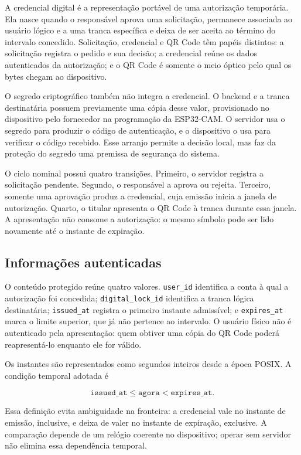 A credencial digital é a representação portável de uma autorização temporária. Ela nasce quando o responsável aprova uma solicitação, permanece associada ao usuário lógico e a uma tranca específica e deixa de ser aceita ao término do intervalo concedido. Solicitação, credencial e QR Code têm papéis distintos: a solicitação registra o pedido e sua decisão; a credencial reúne os dados autenticados da autorização; e o QR Code é somente o meio óptico pelo qual os bytes chegam ao dispositivo.

O segredo criptográfico também não integra a credencial. O backend e a tranca destinatária possuem previamente uma cópia desse valor, provisionado no dispositivo pelo fornecedor na programação da ESP32-CAM. O servidor usa o segredo para produzir o código de autenticação, e o dispositivo o usa para verificar o código recebido. Esse arranjo permite a decisão local, mas faz da proteção do segredo uma premissa de segurança do sistema.

O ciclo nominal possui quatro transições. Primeiro, o servidor registra a solicitação pendente. Segundo, o responsável a aprova ou rejeita. Terceiro, somente uma aprovação produz a credencial, cuja emissão inicia a janela de autorização. Quarto, o titular apresenta o QR Code à tranca durante essa janela. A apresentação não consome a autorização: o mesmo símbolo pode ser lido novamente até o instante de expiração.

\subsection{Informações autenticadas}

O conteúdo protegido reúne quatro valores. \texttt{user\_id} identifica a conta à qual a autorização foi concedida; \texttt{digital\_lock\_id} identifica a tranca lógica destinatária; \texttt{issued\_at} registra o primeiro instante admissível; e \texttt{expires\_at} marca o limite superior, que já não pertence ao intervalo. O usuário físico não é autenticado pela apresentação: quem obtiver uma cópia do QR Code poderá reapresentá-lo enquanto ele for válido.

Os instantes são representados como segundos inteiros desde a época POSIX. A condição temporal adotada é

\begin{equation}
    \texttt{issued\_at} \leq \texttt{agora} < \texttt{expires\_at}.
\end{equation}

Essa definição evita ambiguidade na fronteira: a credencial vale no instante de emissão, inclusive, e deixa de valer no instante de expiração, exclusive. A comparação depende de um relógio coerente no dispositivo; operar sem servidor não elimina essa dependência temporal.

